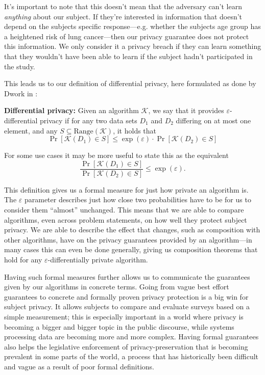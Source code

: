 \documentclass[12pt]{article}
\newcommand{\fancy}{\mathcal}
\renewcommand{\epsilon}{\varepsilon}
\begin{document}
It's important to note that this doesn't mean that the adversary can't learn \emph{anything} about our subject. If they're interested in information that doesn't depend on the subjects specific response---e.g. whether the subjects age group has a heightened risk of lung cancer---then our privacy guarantee does not protect this information. We only consider it a privacy breach if they can learn something that they wouldn't have been able to learn if the subject hadn't participated in the study. \bigskip


This leads us to our definition of differential privacy, here formulated as done by Dwork in \cite{dwork2006_diffpriv}:

\begin{mdframed}
    \textbf{Differential privacy:} Given an algorithm $\fancy{K}$, we say that it provides $\epsilon$-differential privacy if for any two data sets $D_1$ and $D_2$ differing on at most one element, and any $S \subseteq \text{Range}(\fancy{K})$, it holds that
    \begin{equation}\label{eq:diffpriv}
        \Pr[\fancy{K}(D_1) \in S] \leq \exp(\epsilon) \cdot \Pr[\fancy{K}(D_2) \in S]
    \end{equation}
\end{mdframed}

For some use cases it may be more useful to state this as the equivalent
\begin{equation*}
    \frac{\Pr[\fancy{K}(D_1) \in S]}{\Pr[\fancy{K}(D_2) \in S]} \leq \exp(\epsilon).
\end{equation*}\bigskip

This definition gives us a formal measure for just how private an algorithm is. The $\epsilon$ parameter describes just how close two probabilities have to be for us to consider them ``almost'' unchanged. This means that we are able to compare algorithms, even across problem statements, on how well they protect subject privacy. We are able to describe the effect that changes, such as composition with other algorithms, have on the privacy guarantees provided by an algorithm---in many cases this can even be done generally, giving us composition theorems that hold for any $\epsilon$-differentially private algorithm.

Having such formal measures further allows us to communicate the guarantees given by our algorithms in concrete terms. Going from vague best effort guarantees to concrete and formally proven privacy protection is a big win for subject privacy. It allows subjects to compare and evaluate surveys based on a simple measurement; this is especially important in a world where privacy is becoming a bigger and bigger topic in the public discourse, while systems processing data are becoming more and more complex. Having formal guarantees also helps the legislative enforcement of privacy-preservation that is becoming prevalent in some parts of the world, a process that has historically been difficult and vague as a result of poor formal definitions. \bigskip
\end{document}
